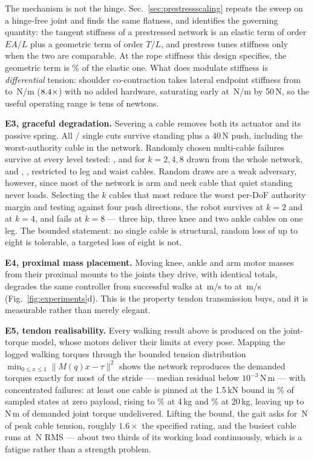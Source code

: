 \documentclass[conference]{IEEEtran}
\begin{document}
The mechanism is not the hinge. Sec.~\ref{sec:prestressscaling} repeats the
sweep on a hinge-free joint and finds the same flatness, and identifies the
governing quantity: the tangent stiffness of a prestressed network is an
elastic term of order $EA/L$ plus a geometric term of order $T/L$, and
prestress tunes stiffness only when the two are comparable. At the rope
stiffness this design specifies, the geometric term is
\jointGeomElasticRope\% of the elastic one. What does modulate stiffness is
\emph{differential} tension: shoulder co-contraction takes lateral endpoint
stiffness from \stiffCoLo{} to \stiffCoHi\,N/m ($8.4\times$) with no
added hardware, saturating early at \stiffCoKnee\,N/m by 50\,N, so the useful
operating range is tens of newtons.

\textbf{E3, graceful degradation.} Severing a cable removes both its actuator
and its passive spring. All \eThreeSinglesOk/\eThreeSinglesN{} single cuts
survive standing plus a 40\,N push, including the worst-authority cable in the
network. Randomly chosen multi-cable failures survive at every level tested:
\eThreeRandTwo, \eThreeRandFour{} and \eThreeRandEight{} for $k=2,4,8$ drawn
from the whole network, and \eThreeLegTwo, \eThreeLegFour, \eThreeLegEight{}
restricted to leg and waist cables. Random draws are a weak adversary,
however, since most of the network is arm and neck cable that quiet standing
never loads. Selecting the $k$ cables that most reduce the worst per-DoF
authority margin and testing against four push directions, the robot survives
\eThreeAdvTwo{} at $k=2$ and \eThreeAdvFour{} at $k=4$, and fails
\eThreeAdvEight{} at $k=8$ --- three hip, three knee and two ankle cables on
one leg. The bounded statement: no single cable is structural, random loss of
up to eight is tolerable, a targeted loss of eight is not.

\textbf{E4, proximal mass placement.} Moving knee, ankle and arm motor masses
from their proximal mounts to the joints they drive, with identical totals,
degrades the same controller from \walkRate{} successful walks at
\walkSpeed\,m/s to \distalRate{} at \distalSpeed\,m/s
(Fig.~\ref{fig:experiments}d). This is the property tendon transmission buys,
and it is measurable rather than merely elegant.

\textbf{E5, tendon realisability.} Every walking result above is produced on
the joint-torque model, whose motors deliver their limits at every pose.
Mapping the logged walking torques through the bounded tension distribution
$\min_{0\le x\le 1}\|M(q)x-\tau\|^2$ shows the network reproduces the demanded
torques exactly for most of the stride --- median residual below
$10^{-3}$\,N\,m --- with concentrated failures: at least one cable is pinned
at the 1.5\,kN bound in \tensSatPct\% of sampled states at zero payload,
rising to \tensSatFour\% at 4\,kg and \tensSatTwenty\% at 20\,kg, leaving up
to \tensResidTwelve\,N\,m of demanded joint torque undelivered. Lifting the
bound, the gait asks for \tensNeeded\,N of peak cable tension, roughly
$1.6\times$ the specified rating, and the busiest cable runs at
\tensBusiestRms\,N RMS --- about two thirds of its working load continuously,
which is a fatigue rather than a strength problem.
\end{document}

